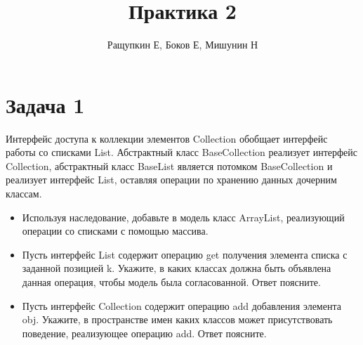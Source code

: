 \documentclass{article}
\begin{document}
\title{Практика 2}
\author{Ращупкин Е, Боков Е, Мишунин Н}
\maketitle

\section{Задача 1}
Интерфейс доступа к коллекции элементов Collection обобщает интерфейс работы со списками List. Абстрактный класс BaseCollection реализует интерфейс Collection, абстрактный класс BaseList является потомком BaseCollection и реализует интерфейс List, оставляя операции по хранению данных дочерним классам.

\begin{itemize}
    \item Используя наследование, добавьте в модель класс ArrayList, реализующий операции со списками с помощью массива.
    \item Пусть интерфейс List содержит операцию get получения элемента списка с заданной позицией k. Укажите, в каких классах должна быть объявлена данная операция, чтобы модель была согласованной. Ответ поясните.
    \item Пусть интерфейс Collection содержит операцию add добавления элемента obj. Укажите, в пространстве имен каких классов может присутствовать поведение, реализующее операцию add. Ответ поясните.
\end{itemize}
\end{document}
